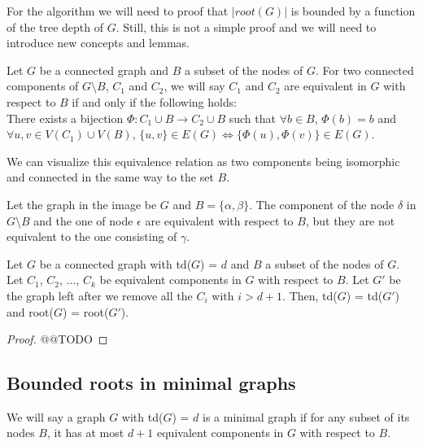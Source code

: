 For the algorithm we will need to proof that $|root(G)|$ is bounded by a function of the tree depth of $G$. Still, this is not a simple proof and we will need to introduce new concepts and lemmas.

\begin{definition}
Let $G$ be a connected graph and $B$ a subset of the nodes of $G$. For two connected components of $G \setminus B$, $C_1$ and $C_2$, we will say $C_1$ and $C_2$ are equivalent in $G$ with respect to $B$ if and only if the following holds: \\
There exists a bijection $\Phi : C_1 \cup B \longrightarrow C_2 \cup B$ such that $\forall b \in B$, $\Phi (b) = b$ and $\forall u, v \in V(C_1) \cup V(B)$, $\{u, v\} \in E(G) \iff \{\Phi (u), \Phi (v) \} \in E(G)$.
\end{definition}

We can visualize this equivalence relation as two components being isomorphic and connected in the same way to the set $B$.

\begin{example}
Let the graph in the image be $G$ and $B = \{\alpha, \beta \}$. The component of the node $\delta$ in $G \setminus B$ and the one of node $\epsilon$ are equivalent with respect to $B$, but they are not equivalent to the one consisting of $\gamma$.
\begin{figure}[!h]
\centering

\end{figure}
\end{example}

\begin{lemma}
Let $G$ be a connected graph with td($G$) = $d$ and $B$ a subset of the nodes of $G$. Let $C_1$, $C_2$, $\dots$, $C_k$ be equivalent components in $G$ with respect to $B$. Let $G'$ be the graph left after we remove all the $C_i$ with $i > d + 1$. Then, td($G$) = td($G'$) and root($G$) = root($G'$).
\label{lemma:equiv-comps}
\end{lemma}
\begin{proof}
@@TODO
\end{proof}

\subsection{Bounded roots in minimal graphs}
\begin{definition}
We will say a graph $G$ with td($G$) = $d$ is a minimal graph if for any subset of its nodes $B$, it has at most $d + 1$ equivalent components in $G$ with respect to $B$. 
\end{definition}

